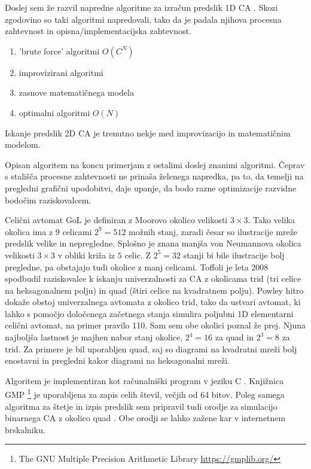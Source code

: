 \documentclass[12pt,a4paper,openany,twoside]{book}
\begin{document}
Doslej sem že razvil napredne algoritme za izračun predslik 1D CA \cite{JerasDobnikar2007}.
Skozi zgodovino so taki algoritmi napredovali, tako da je padala njihova
procesna zahtevnost in opisna/implementacijska zahtevnost.
\begin{enumerate}
 \item 'brute force' algoritmi \( O(C^N) \)
 \item improvizirani algoritmi
 \item zasnove matematičnega modela
 \item optimalni algoritmi \( O(N) \)
\end{enumerate}
Iskanje predslik 2D CA je trenutno nekje med improvizacijo in matematičnim modelom.

Opisan algoritem na koncu primerjam z ostalimi doslej znanimi algoritmi.
Čeprav s stališča procesne zahtevnosti ne prinaša želenega napredka,
pa to, da temelji na pregledni grafični upodobitvi, daje upanje,
da bodo razne optimizacije razvidne bodočim raziskovalcem.

Celični avtomat GoL je definiran z Moorovo okolico velikosti \(3 \times 3\).
Tako velika okolica ima z \(9\) celicami \(2^9=512\) možnih stanj,
zaradi česar so ilustracije mreže predslik velike in nepregledne.
Splošno je znana manjša von Neumannova okolica velikosti \(3 \times 3\) v obliki križa iz \(5\) celic.
Z \(2^5=32\) stanji bi bile ilustracije bolj pregledne, pa obstajajo tudi okolice z manj celicami.
Toffoli \cite{Toffoli2008} je leta 2008 spodbudil raziskovalce k iskanju univerzalnosti za CA
z okolicama trid (tri celice na heksagonalnem polju) in quad (štiri celice na kvadratnem polju).
Powley \cite{Powley2008} hitro dokaže obstoj univerzalnega avtomata z okolico trid,
tako da ustvari avtomat, ki lahko s pomočjo določenega začetnega stanja
simulira poljubni 1D elementarni celični avtomat, na primer pravilo 110.
Sam sem obe okolici poznal že prej. Njuna najboljša lastnost je majhen nabor stanj okolice,
\(2^4=16\) za quad in \(2^3=8\) za trid. Za primere je bil uporabljen quad,
saj so diagrami na kvadratni mreži bolj enostavni in pregledni kakor diagrami na heksagonalni mreži.

Algoritem je implementiran kot računalniški program v jeziku C \cite{Jeras2016-algirithm}.
Knjižnica GMP \footnote{The GNU Multiple Precision Arithmetic Library \url{https://gmplib.org/}}
je uporabljena za zapis celih števil, večjih od 64 bitov.
Poleg samega algoritma za štetje in izpis predslik sem pripravil tudi
orodje za simulacijo binarnega CA z okolico quad \cite{Jeras2016-quad}.
Obe orodji se lahko zažene kar v internetnem brskalniku.
\end{document}
